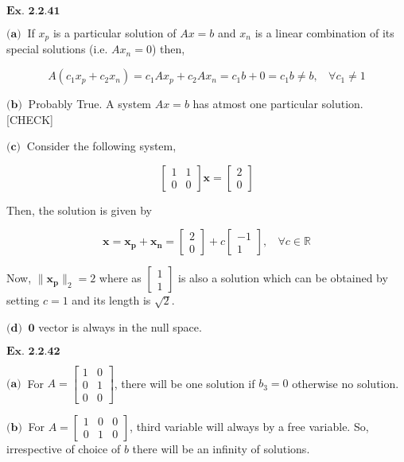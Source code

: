 \documentclass{article}
\begin{document}
\raggedright

${\textbf{Ex. 2.2.41}}$

$\textbf{(a)} \ $ If $x_p$ is a particular solution of $Ax = b$ and $x_n$ is a linear combination of its special solutions (i.e. $Ax_n = 0$)  then,

$$
A(c_1x_p+c_2x_n) = c_1Ax_p + c_2Ax_n = c_1b + 0 = c_1 b \neq b, \ \ \ \  \forall c_1 \neq 1
$$

$\textbf{(b)} \ $ Probably True. A system $Ax=b$ has atmost one particular solution. [CHECK]

$\textbf{(c)} \ $ Consider the following system,

$$
\begin{bmatrix}1 & 1 \\ 0 & 0\end{bmatrix} \mathbf{x} = \begin{bmatrix}2 \\ 0\end{bmatrix}
$$

Then, the solution is given by

$$
\mathbf{x} = \mathbf{x_p} + \mathbf{x_n} = \begin{bmatrix}2 \\ 0\end{bmatrix} + c\begin{bmatrix}-1 \\ 1\end{bmatrix}, \ \ \ \ \forall c \in \mathbb{R}
$$

Now, $\|\mathbf{x_p}\|_2 = 2$ where as $\begin{bmatrix}1 \\ 1 \end{bmatrix}$ is also a solution which can be obtained by setting $c = 1$ and its length is $\sqrt{2}$.

$\textbf{(d)} \ $ $\mathbf{0}$ vector is always in the null space.

\vspace{0.2in}

${\textbf{Ex. 2.2.42}}$

$\textbf{(a)} \ $ For $A = \begin{bmatrix}1 & 0 \\ 0 & 1 \\ 0 & 0\end{bmatrix}$, there will be one solution if $b_3 = 0$ otherwise no solution.

$\textbf{(b)} \ $ For $A = \begin{bmatrix}1 & 0 & 0\\ 0 & 1 & 0\end{bmatrix}$, third variable will always by a free variable. So, irrespective of choice of $b$ there will be an infinity of solutions.
\end{document}
